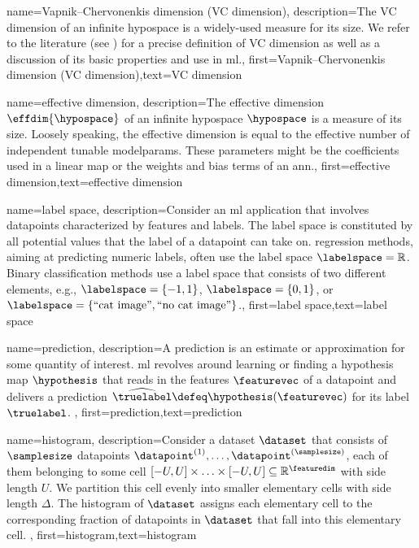 {{
{name={Vapnik–Chervonenkis dimension (VC dimension)},
	description={The VC dimension of an infinite \gls{hypospace} is a widely-used measure 
		for its size. We refer to the literature (see \cite{ShalevMLBook}) for a precise definition of VC dimension 
		as well as a discussion of its basic properties and use in \gls{ml}.},
	first={Vapnik–Chervonenkis dimension (VC dimension)},text={VC dimension}  
}

{name={effective dimension},
	description={The effective dimension $\effdim{\hypospace}$ of 
		an infinite \gls{hypospace} $\hypospace$ is a measure of its size. Loosely speaking, the 
		effective dimension is equal to the effective number of independent tunable \gls{modelparams}. 
		These \gls{parameters} might be the coefficients used in a linear map or the 
		\gls{weights} and bias terms of an \gls{ann}.},
	first={effective dimension},text={effective dimension}  
}

{name={label space},
	description={Consider an \gls{ml} application that involves \gls{datapoint}s characterized by \gls{feature}s 
		and \gls{label}s. The \gls{label} space is constituted by all potential values that the \gls{label} 
		of a \gls{datapoint} can take on. \Gls{regression} methods, aiming at predicting numeric \gls{label}s, often
		 use the \gls{label} space $\labelspace = \mathbb{R}$. Binary \gls{classification} methods use a \gls{label} space 
 		that consists of two different elements, e.g., $\labelspace =\{-1,1\}$, $\labelspace=\{0,1\}$, 
		or $\labelspace = \{ \mbox{``cat image''}, \mbox{``no cat image''} \}$.}, first={label space},text={label space}  
}

{name={prediction},
	description={A prediction is an estimate or approximation for some 
		quantity of interest. \Gls{ml} revolves around learning or finding a \gls{hypothesis} map $\hypothesis$ 
		that reads in the \gls{feature}s $\featurevec$ of a \gls{datapoint} and delivers a prediction 
		$\widehat{\truelabel} \defeq \hypothesis(\featurevec)$ for its \gls{label} $\truelabel$. },
	first={prediction},text={prediction}  
}


{name={histogram},
	description={Consider a \gls{dataset} $\dataset$ that consists of $\samplesize$ \gls{datapoint}s 
		$\datapoint^{(1)},\ldots,\datapoint^{(\samplesize)}$, each of them belonging to some 
		cell $[-U,U] \times \ldots \times [-U,U] \subseteq \mathbb{R}^{\featuredim}$ with side 
		length $U$. We partition this cell evenly into smaller elementary cells with side 
		length $\Delta$. The histogram of $\dataset$ assigns each elementary cell to 
		the corresponding fraction of \gls{datapoint}s in $\dataset$ that fall into this 
		elementary cell. 
	},
	first={histogram},text={histogram}  
}

}}
